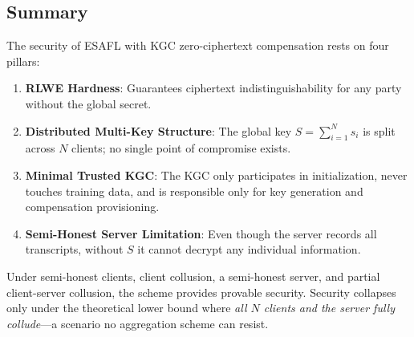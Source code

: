 \subsection{Summary}
\label{ssec:summary}

The security of ESAFL with KGC zero-ciphertext compensation rests on four pillars:
\begin{enumerate}
    \item \textbf{RLWE Hardness}: Guarantees ciphertext indistinguishability for any party without the global secret.
    \item \textbf{Distributed Multi-Key Structure}: The global key $S = \sum_{i=1}^{N} s_i$ is split across $N$ clients; no single point of compromise exists.
    \item \textbf{Minimal Trusted KGC}: The KGC only participates in initialization, never touches training data, and is responsible only for key generation and compensation provisioning.
    \item \textbf{Semi-Honest Server Limitation}: Even though the server records all transcripts, without $S$ it cannot decrypt any individual information.
\end{enumerate}

Under semi-honest clients, client collusion, a semi-honest server, and partial client-server collusion, the scheme provides provable security. Security collapses only under the theoretical lower bound where \emph{all $N$ clients and the server fully collude}---a scenario no aggregation scheme can resist.
